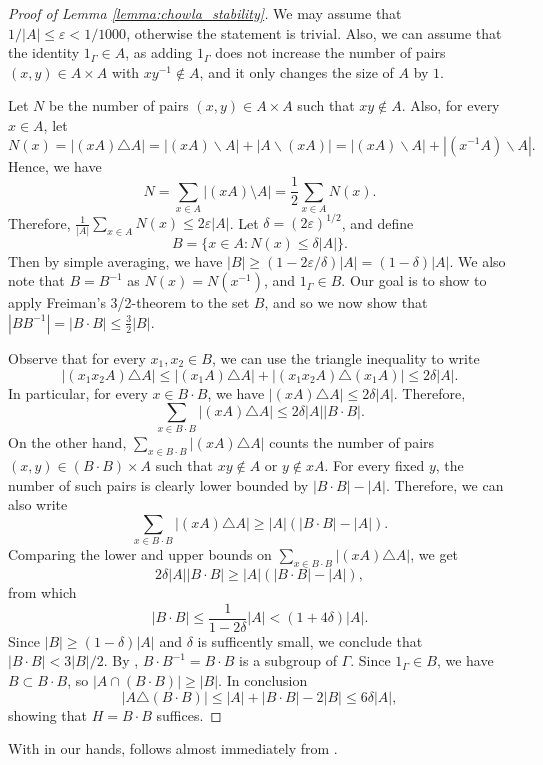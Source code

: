 \documentclass[11pt]{article}
\theoremstyle{plain}
\theoremstyle{definition}
\newcommand{\eps}{\varepsilon}
\begin{document}
\begin{proof}[Proof of Lemma \ref{lemma:chowla_stability}]
We may assume that $1/|A| \le \eps<1/1000$, otherwise the statement is trivial. Also, we can assume that the identity $1_\Gamma\in A$, as adding $1_\Gamma$ does not increase the number of pairs $(x,y)\in A\times A$ with $xy^{-1}\not\in A$, and it only changes the size of $A$ by $1$.

Let $N$ be the number of pairs $(x,y)\in A\times A$ such that $xy\not\in A$. 
Also, for every $x\in A$, let $$N(x)=|(xA)\triangle A|=|(xA)\backslash A|+|A\backslash (xA)|=|(xA)\backslash A|+|(x^{-1}A)\backslash A|.$$
Hence, we have $$
    N= \sum_{x \in A} |(xA)\setminus A|
    = \frac{1}{2}\sum_{x\in A}N(x).
$$
Therefore, $\frac{1}{|A|}\sum_{x\in A}N(x)\leq 2\eps |A|$. 
Let $\delta=(2\eps)^{1/2}$, and define $$B=\{x\in A: N(x)\leq \delta |A|\}.$$
Then by simple averaging, we have $|B|\geq (1-2\eps/\delta)|A|=(1-\delta)|A|$. 
We also note that $B=B^{-1}$ as $N(x)=N(x^{-1})$, and $1_\Gamma\in B$. 
Our goal is to show to apply Freiman's 3/2-theorem to the set $B$, and so we now show that $|BB^{-1}|=|B\cdot B|\leq \frac{3}{2}|B|$.

Observe that for every $x_1,x_2\in B$, we can use the triangle inequality to write
$$|(x_1x_2A)\triangle A|\leq |(x_1A) \triangle A|+|(x_1x_2A)\triangle (x_1A)|\leq 2\delta |A|.$$
In particular, for every $x\in B\cdot B$, we have $|(xA)\triangle A|\leq 2\delta |A|$. 
Therefore, $$\sum_{x\in B\cdot B} |(xA)\triangle A|\leq 2\delta |A||B\cdot B|.$$
On the other hand, $\sum_{x\in B\cdot B} |(xA)\triangle A|$ counts the number of pairs $(x,y)\in (B\cdot B)\times A$ such that $xy\not\in A$ or $y\not\in xA$. 
For every fixed $y$, the number of such pairs is clearly lower bounded by $|B\cdot B|-|A|$. Therefore, we can also write
$$\sum_{x\in B\cdot B} |(xA)\triangle A|\geq |A|(|B\cdot B|-|A|).$$
Comparing the lower and upper bounds on $\sum_{x\in B\cdot B} |(xA)\triangle A|$, we get
$$2\delta |A||B\cdot B|\geq |A|(|B\cdot B|-|A|),$$
from which
$$|B\cdot B|\leq \frac{1}{1-2\delta} |A|<(1+4\delta)|A|.$$
Since $|B|\geq (1-\delta)|A|$ and $\delta$ is sufficently small, we conclude that $|B\cdot B|< 3|B|/2$. 
By , $B\cdot B^{-1}=B\cdot B$ is a subgroup of $\Gamma$. Since $1_\Gamma\in B$, we have $B\subset B\cdot B$, so $|A\cap (B\cdot B)|\geq |B|$. In conclusion
$$|A\triangle (B\cdot B)|\leq |A|+|B\cdot B|-2|B|\leq  6\delta |A|,$$
showing that $H=B\cdot B$ suffices.
\end{proof}

With  in our hands,  follows almost immediately from .
\end{document}
